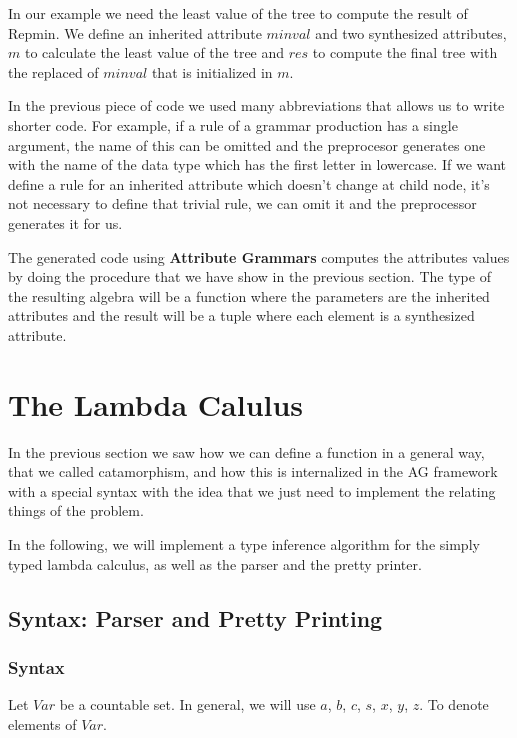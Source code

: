 \documentclass[a4paper,10pt]{article}
\begin{document}
In our example we need the least value of the tree to compute the result of Repmin. We define
an inherited attribute $minval$ and two synthesized attributes, $m$ to calculate the least value
of the tree and $res$ to compute the final tree with the replaced of $minval$ that is initialized
in $m$.
  
In the previous piece of code we used many abbreviations that allows us to write shorter code.
For example, if a rule of a grammar production has a single argument, the name of this can be omitted and the preprocesor generates 
one with the name of the data type which has the first letter in lowercase. 
If we want define a rule for an inherited attribute which doesn't change at child node, 
it's not necessary to define that trivial rule, we can omit it and the preprocessor generates it for us.

The generated code using \textbf{Attribute Grammars} computes the attributes values by doing the
procedure that we have show in the previous section. The type of the resulting algebra will be a function
where the parameters are the inherited attributes and the result will be a tuple where each element
is a synthesized attribute.
  
\section{The Lambda Calulus}

In the previous section we saw how we can define a function in a general way, that we called
catamorphism, and how this is internalized in the AG framework with a special syntax
with the idea that we just need to implement the relating things of the problem.

In the following, we will implement a type inference algorithm for the simply typed lambda
calculus, as well as the parser and the pretty printer.

\subsection{Syntax: Parser and Pretty Printing}

\subsubsection{Syntax}

Let $Var$ be a countable set. In general, we will use $a$, $b$, $c$, $s$, $x$, $y$, $z$. To
denote elements of $Var$.
\end{document}
